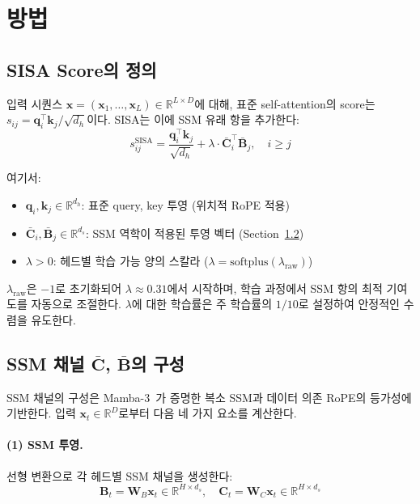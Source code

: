 \documentclass[11pt]{article}
\begin{document}
\section{방법}

\subsection{SISA Score의 정의}

입력 시퀀스 $\mathbf{x} = (\mathbf{x}_1, \ldots, \mathbf{x}_L) \in \mathbb{R}^{L \times D}$에 대해, 표준 self-attention의 score는 $s_{ij} = \mathbf{q}_i^\top \mathbf{k}_j / \sqrt{d_h}$이다. SISA는 이에 SSM 유래 항을 추가한다:
\begin{equation}
s_{ij}^{\text{SISA}} = \frac{\mathbf{q}_i^\top \mathbf{k}_j}{\sqrt{d_h}} + \lambda \cdot \bar{\mathbf{C}}_i^\top \bar{\mathbf{B}}_j, \quad i \geq j
\label{eq:sisa_score}
\end{equation}

여기서:
\begin{itemize}[leftmargin=*]
\item $\mathbf{q}_i, \mathbf{k}_j \in \mathbb{R}^{d_h}$: 표준 query, key 투영 (위치적 RoPE 적용)
\item $\bar{\mathbf{C}}_i, \bar{\mathbf{B}}_j \in \mathbb{R}^{d_s}$: SSM 역학이 적용된 투영 벡터 (Section~\ref{sec:ssm_channels})
\item $\lambda > 0$: 헤드별 학습 가능 양의 스칼라 ($\lambda = \text{softplus}(\lambda_{\text{raw}})$)
\end{itemize}

$\lambda_{\text{raw}}$은 $-1$로 초기화되어 $\lambda \approx 0.31$에서 시작하며, 학습 과정에서 SSM 항의 최적 기여도를 자동으로 조절한다. $\lambda$에 대한 학습률은 주 학습률의 $1/10$로 설정하여 안정적인 수렴을 유도한다.

\subsection{SSM 채널 $\bar{\mathbf{C}}$, $\bar{\mathbf{B}}$의 구성}
\label{sec:ssm_channels}

SSM 채널의 구성은 Mamba-3~\citep{mamba3}가 증명한 복소 SSM과 데이터 의존 RoPE의 등가성에 기반한다. 입력 $\mathbf{x}_t \in \mathbb{R}^D$로부터 다음 네 가지 요소를 계산한다.

\paragraph{(1) SSM 투영.} 선형 변환으로 각 헤드별 SSM 채널을 생성한다:
\begin{equation}
\mathbf{B}_t = \mathbf{W}_B \mathbf{x}_t \in \mathbb{R}^{H \times d_s}, \quad \mathbf{C}_t = \mathbf{W}_C \mathbf{x}_t \in \mathbb{R}^{H \times d_s}
\end{equation}
\end{document}

